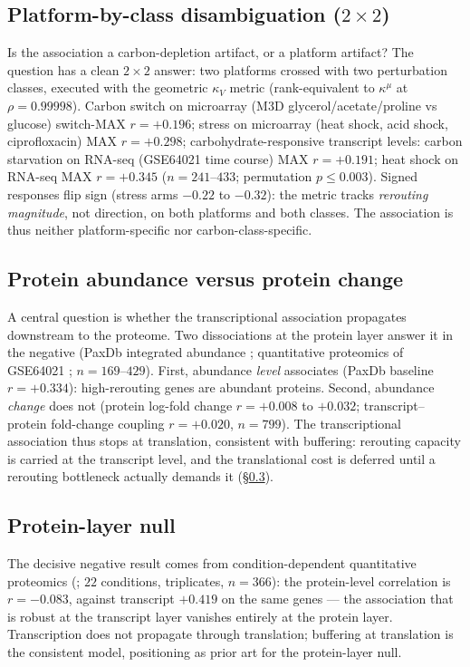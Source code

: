 \documentclass[11pt,a4paper]{article}
\theoremstyle{plain}
\theoremstyle{definition}
\theoremstyle{remark}
\newcommand{\kk}{\kappa_{\!V}}
\newcommand{\kmu}{\kappa^{\mu}}
\begin{document}
\subsection{Platform-by-class disambiguation ($2 \times 2$)}
\label{sec:e25}
Is the association a carbon-depletion artifact, or a platform
artifact? The question has a clean $2 \times 2$ answer: two platforms
crossed with two perturbation classes, executed with the geometric $\kk$ metric
(rank-equivalent to $\kmu$ at $\rho = 0.99998$). Carbon switch on
microarray (M3D glycerol/acetate/proline vs glucose) switch-MAX $r =
+0.196$; stress on microarray (heat shock, acid shock, ciprofloxacin)
MAX $r = +0.298$; carbohydrate-responsive transcript levels: carbon
starvation on RNA-seq (GSE64021 \citep{barrett2013} time course) MAX
$r = +0.191$; heat shock on RNA-seq MAX $r = +0.345$ ($n = 241$--$433$;
permutation $p \le 0.003$). Signed responses flip sign (stress arms
$-0.22$ to $-0.32$): the metric tracks \emph{rerouting magnitude},
not direction, on both platforms and both classes. The association is
thus neither platform-specific nor carbon-class-specific.

\subsection{Protein abundance versus protein change}
\label{sec:e26}
A central question is whether the transcriptional
association propagates downstream to the proteome. Two dissociations
at the protein layer answer it in the negative (PaxDb integrated
abundance \citep{wang2015}; quantitative proteomics of GSE64021
\citep{barrett2013};
$n = 169$--$429$). First, abundance \emph{level} associates (PaxDb
baseline $r = +0.334$): high-rerouting genes are abundant proteins.
Second, abundance \emph{change} does not (protein log-fold change $r
= +0.008$ to $+0.032$; transcript--protein fold-change coupling
$r = +0.020$, $n = 799$). The transcriptional association thus stops
at translation, consistent with buffering: rerouting capacity is
carried at the transcript level, and the translational cost is
deferred until a rerouting bottleneck actually demands it
(\S\ref{sec:e27}).

\subsection{Protein-layer null}
\label{sec:e27}
The decisive negative result comes from condition-dependent
quantitative proteomics (\citet{schmidt2016}; $22$ conditions, triplicates,
$n = 366$): the protein-level correlation is $r = -0.083$, against
transcript $+0.419$ on the same genes --- the association that is
robust at the transcript layer vanishes entirely at the protein
layer. Transcription does not propagate through translation;
buffering at translation is the consistent model, positioning
\citet{kochanowski2013} as prior art for the protein-layer null.
\end{document}
